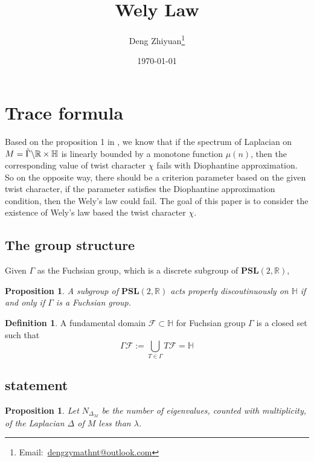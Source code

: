 \documentclass[12pt,a4paper,english]{article}
\title{Wely Law}
\date{\today}
\author{Deng Zhiyuan\footnote{Email:\ \href{mailto:dengzymathnt@outlook.com}{dengzymathnt@outlook.com}}}
\theoremstyle{plain}
\newtheorem{prop}[thm]{Proposition}
\theoremstyle{definition}
\newtheorem{defi}{Definition}
\theoremstyle{remark}
\begin{document}
\maketitle
\newpage

\tableofcontents
\newpage

\section{Trace formula}

Based on the proposition 1 in \cite{hoffmann1991cuspidal}, we know that if the spectrum of Laplacian on $M=\Tilde{\Gamma}\backslash\mathbb{R}\times\mathbb{H}$ is linearly bounded by a monotone function $\mu(n)$, then the corresponding value of twist character $\chi$ fails with Diophantine approximation.  So on the opposite way, there should be a criterion parameter based on the given twist character, if the parameter satisfies the Diophantine approximation condition, then the Wely's law could fail. The goal of this paper is to consider the existence of Wely's law based the twist character $\chi$.

\subsection{The group structure} 
Given $\Gamma$ as the Fuchsian group, which is a discrete subgroup of $\textbf{PSL}(2,\mathbb{R})$, 
\begin{prop}
    A subgroup of $\textbf{PSL}(2,\mathbb{R})$ acts properly discoutinuously on $\mathbb{H}$ if and only if $\Gamma$ is a Fuchsian group.
\end{prop}
\begin{defi}
    A fundamental domain $\mathcal{F}\subset \mathbb{H}$ for Fuchsian group $\Gamma$ is a closed set such that 
    \begin{equation*}
        \Gamma\mathcal{F}:=\bigcup_{T\in\Gamma}T\mathcal{F}=\mathbb{H}
    \end{equation*}
\end{defi}

\subsection{statement}
\begin{prop}
Let $N_{\Delta_{M}}$ be the number of eigenvalues, counted with multiplicity, of the Laplacian $\Delta$ of $M$ less than $\lambda$.   
\end{prop}
\end{document}
